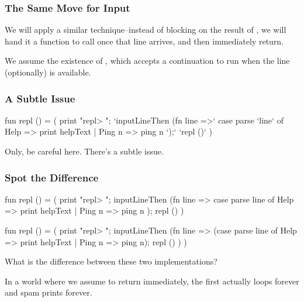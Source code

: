 \documentclass[aspectratio=169]{beamer}
\begin{document}
\begin{frame}[fragile]
  \frametitle{The Same Move for Input}

  We will apply a similar technique--instead of blocking on the result of
  , we will hand it a function to call once that line
  arrives, and then immediately return.

  \pause
  \vspace{\fill}

  We assume the existence of , which accepts a continuation
  to run when the line (optionally) is available.
\end{frame}

\begin{frame}[fragile]
  \frametitle{A Subtle Issue}

  {\small
  \begin{codeblock}
    fun repl () =
      ( print "repl> ";
        `inputLineThen (fn line =>`
          case parse `line` of
            Help => print helpText
          | Ping n => ping n
        `);`
        `repl ()`
      )
\end{codeblock}
  }

  \pause
  \vspace{\fill}

  Only, be careful here. There's a subtle issue.
\end{frame}

\begin{frame}[fragile]
  \frametitle{Spot the Difference}

  \begin{minipage}{0.49\textwidth}
  {\small
  \begin{codeblock}
    fun repl () =
      ( print "repl> ";
        inputLineThen (fn line =>
        case parse line of
          Help => print helpText
        | Ping n => ping n
        );
        repl ()
      )
\end{codeblock}
  }
  \end{minipage}
  \begin{minipage}{0.49\textwidth}
  {\small
  \begin{codeblock}
    fun repl () =
      ( print "repl> ";
        inputLineThen (fn line =>
          (case parse line of
            Help => print helpText
          | Ping n => ping n);
          repl ()
        )
      )
\end{codeblock}
  }
  \end{minipage}

  \pause
  \vspace{\fill}

  What is the difference between these two implementations?

  \pause
  \vspace{\fill}

  In a world where we assume  to return immediately,
  the first actually loops forever and spam prints  forever.
\end{frame}
\end{document}
